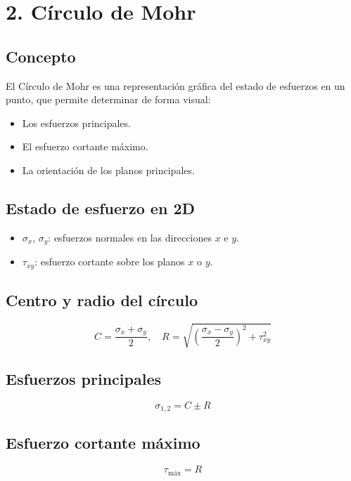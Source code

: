 \documentclass{article} %
\begin{document}
\newpage
\section*{2. Círculo de Mohr}

\subsection*{Concepto}

El Círculo de Mohr es una representación gráfica del estado de esfuerzos en un punto, que permite determinar de forma visual:
\begin{itemize}
    \item Los esfuerzos principales.
    \item El esfuerzo cortante máximo.
    \item La orientación de los planos principales.
\end{itemize}

\subsection*{Estado de esfuerzo en 2D}

\begin{itemize}
    \item $\sigma_x$, $\sigma_y$: esfuerzos normales en las direcciones $x$ e $y$.
    \item $\tau_{xy}$: esfuerzo cortante sobre los planos $x$ o $y$.
\end{itemize}

\subsection*{Centro y radio del círculo}

\[
C = \frac{\sigma_x + \sigma_y}{2}, \quad
R = \sqrt{\left( \frac{\sigma_x - \sigma_y}{2} \right)^2 + \tau_{xy}^2}
\]

\subsection*{Esfuerzos principales}

\[
\sigma_{1,2} = C \pm R
\]

\subsection*{Esfuerzo cortante máximo}

\[
\tau_{\text{máx}} = R
\]
\end{document}
